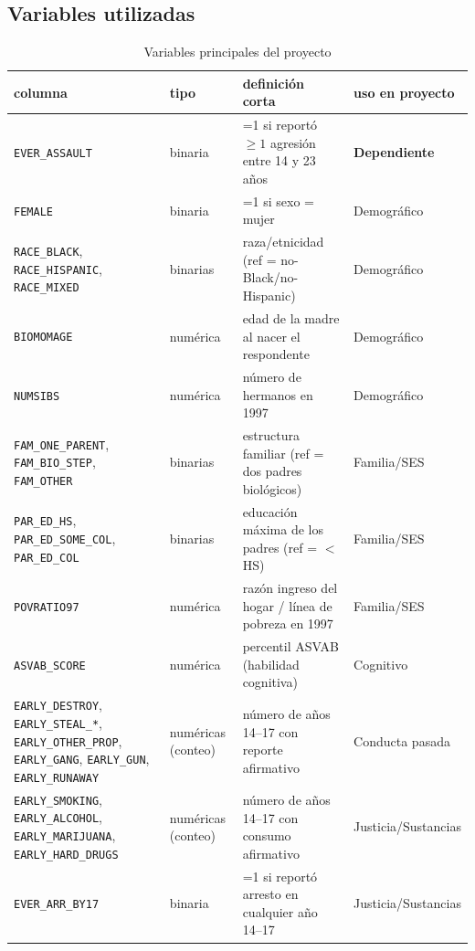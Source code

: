 \documentclass[11pt]{article}
\begin{document}
\subsection{Variables utilizadas}

\begin{table}[H]
\centering
\caption{Variables principales del proyecto}
\label{tab:tabla-variables}
\small
\begin{tabular}{p{3.1cm}p{2.4cm}p{6.2cm}p{2.5cm}}
\toprule
columna & tipo & definición corta & uso en proyecto \\
\midrule
\texttt{EVER\_ASSAULT} & binaria & =1 si reportó $\geq 1$ agresión entre 14 y 23 años & \textbf{Dependiente} \\
\texttt{FEMALE} & binaria & =1 si sexo = mujer & Demográfico \\
\texttt{RACE\_BLACK}, \texttt{RACE\_HISPANIC}, \texttt{RACE\_MIXED} & binarias & raza/etnicidad (ref = no-Black/no-Hispanic) & Demográfico \\
\texttt{BIOMOMAGE} & numérica & edad de la madre al nacer el respondente & Demográfico \\
\texttt{NUMSIBS} & numérica & número de hermanos en 1997 & Demográfico \\
\texttt{FAM\_ONE\_PARENT}, \texttt{FAM\_BIO\_STEP}, \texttt{FAM\_OTHER} & binarias & estructura familiar (ref = dos padres biológicos) & Familia/SES \\
\texttt{PAR\_ED\_HS}, \texttt{PAR\_ED\_SOME\_COL}, \texttt{PAR\_ED\_COL} & binarias & educación máxima de los padres (ref = $<$HS) & Familia/SES \\
\texttt{POVRATIO97} & numérica & razón ingreso del hogar / línea de pobreza en 1997 & Familia/SES \\
\texttt{ASVAB\_SCORE} & numérica & percentil ASVAB (habilidad cognitiva) & Cognitivo \\
\texttt{EARLY\_DESTROY}, \texttt{EARLY\_STEAL\_*}, \texttt{EARLY\_OTHER\_PROP}, \texttt{EARLY\_GANG}, \texttt{EARLY\_GUN}, \texttt{EARLY\_RUNAWAY} & numéricas (conteo) & número de años 14--17 con reporte afirmativo & Conducta pasada \\
\texttt{EARLY\_SMOKING}, \texttt{EARLY\_ALCOHOL}, \texttt{EARLY\_MARIJUANA}, \texttt{EARLY\_HARD\_DRUGS} & numéricas (conteo) & número de años 14--17 con consumo afirmativo & Justicia/Sustancias \\
\texttt{EVER\_ARR\_BY17} & binaria & =1 si reportó arresto en cualquier año 14--17 & Justicia/Sustancias \\
\bottomrule
\end{tabular}
\end{table}
\end{document}
